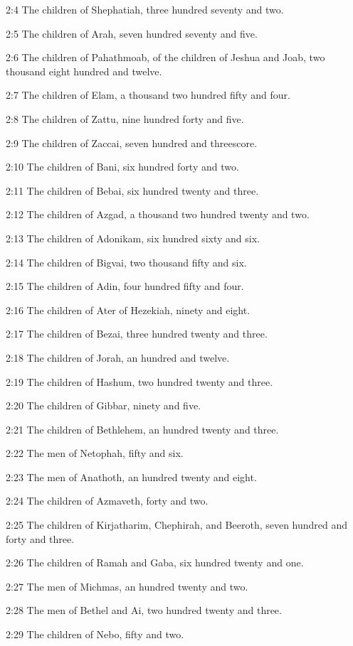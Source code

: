 2:4 The children of Shephatiah, three hundred seventy and two.

2:5 The children of Arah, seven hundred seventy and five.

2:6 The children of Pahathmoab, of the children of Jeshua and Joab,
two thousand eight hundred and twelve.

2:7 The children of Elam, a thousand two hundred fifty and four.

2:8 The children of Zattu, nine hundred forty and five.

2:9 The children of Zaccai, seven hundred and threescore.

2:10 The children of Bani, six hundred forty and two.

2:11 The children of Bebai, six hundred twenty and three.

2:12 The children of Azgad, a thousand two hundred twenty and two.

2:13 The children of Adonikam, six hundred sixty and six.

2:14 The children of Bigvai, two thousand fifty and six.

2:15 The children of Adin, four hundred fifty and four.

2:16 The children of Ater of Hezekiah, ninety and eight.

2:17 The children of Bezai, three hundred twenty and three.

2:18 The children of Jorah, an hundred and twelve.

2:19 The children of Hashum, two hundred twenty and three.

2:20 The children of Gibbar, ninety and five.

2:21 The children of Bethlehem, an hundred twenty and three.

2:22 The men of Netophah, fifty and six.

2:23 The men of Anathoth, an hundred twenty and eight.

2:24 The children of Azmaveth, forty and two.

2:25 The children of Kirjatharim, Chephirah, and Beeroth, seven
hundred and forty and three.

2:26 The children of Ramah and Gaba, six hundred twenty and one.

2:27 The men of Michmas, an hundred twenty and two.

2:28 The men of Bethel and Ai, two hundred twenty and three.

2:29 The children of Nebo, fifty and two.

